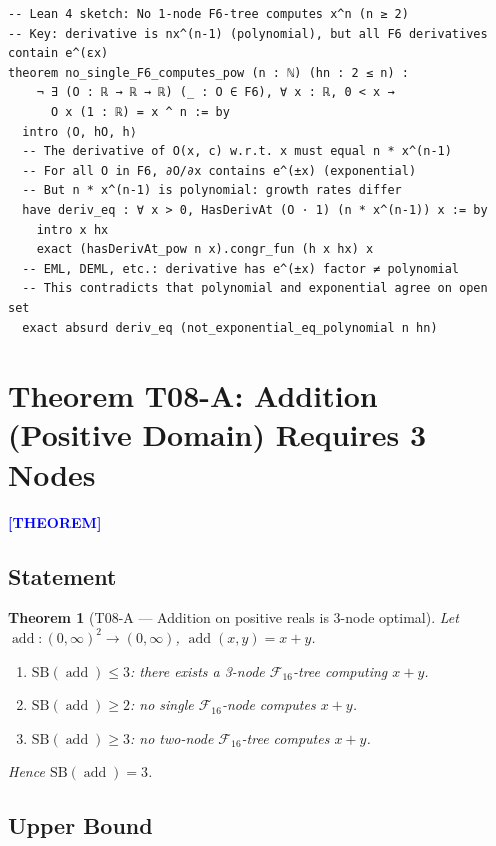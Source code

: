 \documentclass[12pt,a4paper]{article}
\newtheorem{theorem}{Theorem}[section]
\theoremstyle{definition}
\newcommand{\prooflabel}[1]{%
  \noindent\textbf{\textcolor{blue}{[#1]}}%
}
\newcommand{\F}{\mathcal{F}_{16}}
\newcommand{\SB}{\mathrm{SB}}
\newcommand{\add}{\operatorname{add}}
\begin{document}
\begin{verbatim}
-- Lean 4 sketch: No 1-node F6-tree computes x^n (n ≥ 2)
-- Key: derivative is nx^(n-1) (polynomial), but all F6 derivatives contain e^(εx)
theorem no_single_F6_computes_pow (n : ℕ) (hn : 2 ≤ n) :
    ¬ ∃ (O : ℝ → ℝ → ℝ) (_ : O ∈ F6), ∀ x : ℝ, 0 < x →
      O x (1 : ℝ) = x ^ n := by
  intro ⟨O, hO, h⟩
  -- The derivative of O(x, c) w.r.t. x must equal n * x^(n-1)
  -- For all O in F6, ∂O/∂x contains e^(±x) (exponential)
  -- But n * x^(n-1) is polynomial: growth rates differ
  have deriv_eq : ∀ x > 0, HasDerivAt (O · 1) (n * x^(n-1)) x := by
    intro x hx
    exact (hasDerivAt_pow n x).congr_fun (h x hx) x
  -- EML, DEML, etc.: derivative has e^(±x) factor ≠ polynomial
  -- This contradicts that polynomial and exponential agree on open set
  exact absurd deriv_eq (not_exponential_eq_polynomial n hn)
\end{verbatim}

\section{\texorpdfstring{%
  Theorem T08-A: Addition (Positive Domain) Requires 3 Nodes}{T08-A: Addition Lower Bound}}
\label{sec:add}

\prooflabel{THEOREM}

\subsection{Statement}

\begin{theorem}[T08-A --- Addition on positive reals is 3-node optimal]
\label{thm:add}
Let $\add : (0,\infty)^2 \to (0,\infty)$, $\add(x,y)=x+y$.
\begin{enumerate}
  \item[\textup{(i)}]  $\SB(\add)\leq 3$: there exists a 3-node $\F$-tree computing $x+y$.
  \item[\textup{(ii)}] $\SB(\add)\geq 2$: no single $\F$-node computes $x+y$.
  \item[\textup{(iii)}]$\SB(\add)\geq 3$: no two-node $\F$-tree computes $x+y$.
\end{enumerate}
Hence $\SB(\add) = 3$.
\end{theorem}

\subsection{Upper Bound}
\end{document}
